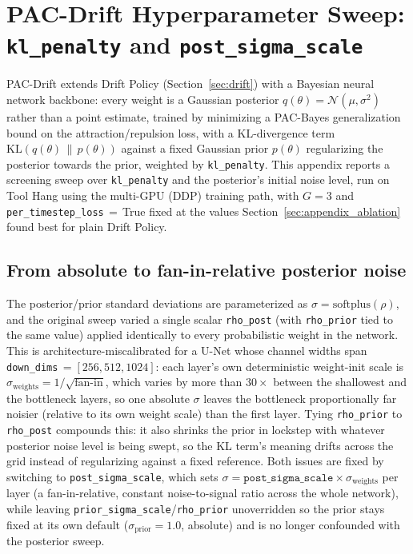 \documentclass[11pt]{article}
\begin{document}
\section{PAC-Drift Hyperparameter Sweep: \texttt{kl\_penalty} and \texttt{post\_sigma\_scale}}
\label{sec:pac_drift_sweep}

PAC-Drift extends Drift Policy (Section~\ref{sec:drift}) with a Bayesian
neural network backbone: every weight is a Gaussian posterior
$q(\theta)=\mathcal{N}(\mu,\sigma^2)$ rather than a point estimate, trained
by minimizing a PAC-Bayes generalization bound on the attraction/repulsion
loss, with a KL-divergence term $\mathrm{KL}(q(\theta)\,\|\,p(\theta))$
against a fixed Gaussian prior $p(\theta)$ regularizing the posterior
towards the prior, weighted by \texttt{kl\_penalty}. This appendix reports
a screening sweep over \texttt{kl\_penalty} and the posterior's initial
noise level, run on Tool Hang using the multi-GPU (DDP) training path, with
$G=3$ and \texttt{per\_timestep\_loss}\,$=$\,True fixed at the values
Section~\ref{sec:appendix_ablation} found best for plain Drift Policy.

\subsection{From absolute to fan-in-relative posterior noise}
\label{sec:sigma_scale_motivation}

The posterior/prior standard deviations are parameterized as
$\sigma=\mathrm{softplus}(\rho)$, and the original sweep varied a single
scalar \texttt{rho\_post} (with \texttt{rho\_prior} tied to the same value)
applied identically to every probabilistic weight in the network. This is
architecture-miscalibrated for a U-Net whose channel widths span
\texttt{down\_dims}\,$=[256,512,1024]$: each layer's own deterministic
weight-init scale is $\sigma_{\text{weights}}=1/\sqrt{\text{fan-in}}$, which
varies by more than $30\times$ between the shallowest and the bottleneck
layers, so one absolute $\sigma$ leaves the bottleneck proportionally far
noisier (relative to its own weight scale) than the first layer. Tying
\texttt{rho\_prior} to \texttt{rho\_post} compounds this: it also shrinks
the prior in lockstep with whatever posterior noise level is being swept,
so the KL term's meaning drifts across the grid instead of regularizing
against a fixed reference. Both issues are fixed by switching to
\texttt{post\_sigma\_scale}, which sets $\sigma = \texttt{post\_sigma\_scale}
\times \sigma_{\text{weights}}$ per layer (a fan-in-relative, constant
noise-to-signal ratio across the whole network), while leaving
\texttt{prior\_sigma\_scale}/\texttt{rho\_prior} unoverridden so the prior
stays fixed at its own default ($\sigma_{\text{prior}}=1.0$, absolute) and
is no longer confounded with the posterior sweep.
\end{document}
